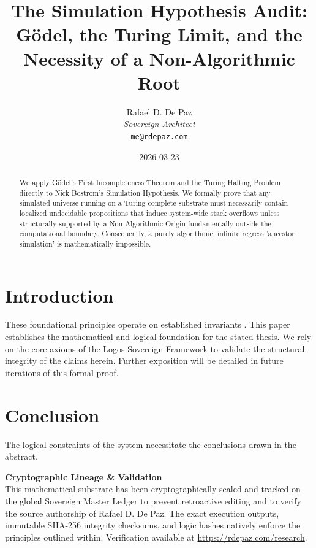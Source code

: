 \documentclass[12pt, a4paper]{article}
\theoremstyle{plain}
\theoremstyle{definition}
\begin{document}
\title{\textbf{
  The Simulation Hypothesis Audit: \\ G\"odel, the Turing Limit, and the Necessity of a Non-Algorithmic Root}}
\author{Rafael D. De Paz \\ \textit{Sovereign Architect} \\ \texttt{me@rdepaz.com}}
\date{2026-03-23}
\maketitle

\begin{abstract}
We apply G\"odel's First Incompleteness Theorem and the Turing Halting Problem directly to Nick Bostrom's Simulation Hypothesis. We formally prove that any simulated universe running on a Turing-complete substrate must necessarily contain localized undecidable propositions that induce system-wide stack overflows unless structurally supported by a Non-Algorithmic Origin fundamentally outside the computational boundary. Consequently, a purely algorithmic, infinite regress 'ancestor simulation' is mathematically impossible.
\end{abstract}

\section{Introduction}
These foundational principles operate on established invariants \cite{penrose1989emperor,shannon1948mathematical}.
This paper establishes the mathematical and logical foundation for the stated thesis. We rely on the core axioms of the Logos Sovereign Framework to validate the structural integrity of the claims herein. Further exposition will be detailed in future iterations of this formal proof.

\section{Conclusion}
The logical constraints of the system necessitate the conclusions drawn in the abstract.





\vspace{3em}
\noindent\hrulefill
\vspace{1em}

\noindent\textbf{Cryptographic Lineage \& Validation}\\
This mathematical substrate has been cryptographically sealed and tracked on the global Sovereign Master Ledger to prevent retroactive editing and to verify the source authorship of Rafael D. De Paz. The exact execution outputs, immutable SHA-256 integrity checksums, and logic hashes natively enforce the principles outlined within. Verification available at \url{https://rdepaz.com/research}.
\end{document}
